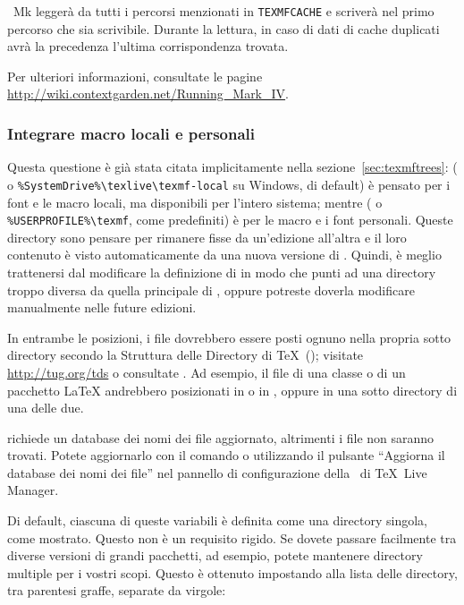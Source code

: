 \documentclass{article}
\begin{document}
\ConTeXt\ Mk leggerà da tutti i percorsi menzionati in
\verb+TEXMFCACHE+ e scriverà nel primo percorso che sia scrivibile. Durante
la lettura, in caso di dati di cache duplicati avrà la precedenza l'ultima
corrispondenza trovata.

Per ulteriori informazioni, consultate le pagine
\url{http://wiki.contextgarden.net/Running_Mark_IV}.


\subsubsection{Integrare macro locali e personali}
\label{sec:local-personal-macros}

Questa questione è già stata citata implicitamente nella
sezione~\ref{sec:texmftrees}:
 ( o
\verb|%SystemDrive%\texlive\texmf-local| su Windows, di default) è pensato
per i font e le macro locali, ma disponibili per l'intero sistema; mentre
 ( o \verb|%USERPROFILE%\texmf|,
come predefiniti) è per le macro e i font personali.%
Queste directory sono pensare per rimanere fisse da un'edizione all'altra
e il loro contenuto è visto automaticamente da una nuova versione di \TL.
Quindi, è meglio trattenersi dal modificare la definizione di
 in modo che punti ad una directory troppo diversa da
quella principale di \TL, oppure potreste doverla modificare manualmente
nelle future edizioni.

In entrambe le posizioni, i file dovrebbero essere posti ognuno nella
propria sotto directory secondo la Struttura delle Directory di \TeX\
(\TDS); visitate \url{http://tug.org/tds} o consultate
. Ad esempio, il file di una
classe o di un pacchetto \LaTeX{} andrebbero posizionati in
 o in , oppure
in una sotto directory di una delle due.

 richiede un database dei nomi dei file aggiornato,
altrimenti i file non saranno trovati. Potete aggiornarlo con il comando
\cmdname{mktexlsr} o utilizzando il pulsante ``Aggiorna il database dei
nomi dei file'' nel pannello di configurazione della \GUI\ di \TeX\ Live
Manager.

Di default, ciascuna di queste variabili è definita come una directory
singola, come mostrato. Questo non è un requisito rigido. Se dovete passare
facilmente tra diverse versioni di grandi pacchetti, ad esempio, potete
mantenere directory multiple per i vostri scopi. Questo è ottenuto
impostando \dirname{TEXMFHOME} alla lista delle directory, tra parentesi
graffe, separate da virgole:
\end{document}
